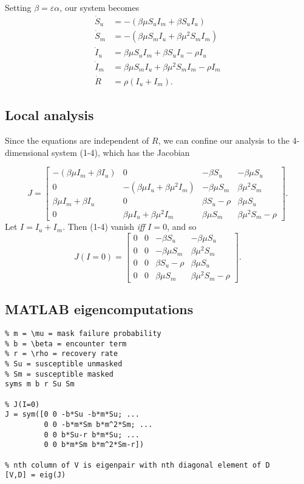 \documentclass[11pt]{article}
\begin{document}
Setting $\beta = \varepsilon \alpha$, our system becomes
\begin{align}
  \dot{S}_{u} &= -(\beta \mu S_{u} I_{m}+\beta S_{u} I_{u}) \\
  \dot{S}_{m} &= -(\beta \mu S_{m} I_{u}+\beta \mu^2 S_{m} I_{m}) \\
  \dot{I}_{u} &= \beta \mu S_{u} I_{m}+\beta S_{u} I_{u}-\rho I_{u} \\
  \dot{I}_{m} &= \beta \mu S_{m} I_{u}+\beta \mu^2 S_{m} I_{m}-\rho I_{m} \\
  \dot{R} &= \rho (I_{u}+I_{m}).
\end{align}

\subsection*{Local analysis}
Since the equations are independent of $R$, we can confine our analysis to the 4-dimensional system (1-4), which has the Jacobian

\[J =
\begin{bmatrix}
  -(\beta \mu I_m + \beta I_u) & 0 & -\beta S_u & -\beta \mu S_u \\
  0 & -(\beta \mu I_u + \beta \mu^2 I_m) & -\beta \mu S_m & \beta \mu^2 S_m \\
  \beta \mu I_m + \beta I_{u} & 0 & \beta S_{u} - \rho & \beta \mu S_{u} \\
  0 & \beta \mu I_{u} + \beta \mu^{2}I_{m} & \beta \mu S_{m} & \beta \mu^{2} S_{m} - \rho
\end{bmatrix}.
\]
Let $I = I_{u} + I_{m}.$ Then (1-4) vanish \textit{iff} $I = 0$, and so
\[ J(I=0)=
\begin{bmatrix}
  0 & 0 & -\beta S_u & -\beta \mu S_u \\
  0 & 0 & -\beta \mu S_m & \beta \mu^2 S_m \\
  0 & 0 & \beta S_u - \rho & \beta \mu S_{u} \\
  0 & 0 & \beta \mu S_{m} & \beta \mu^{2} S_{m} - \rho
\end{bmatrix}.\]

\subsection*{MATLAB eigencomputations}
\begin{verbatim}
% m = \mu = mask failure probability
% b = \beta = encounter term
% r = \rho = recovery rate
% Su = susceptible unmasked
% Sm = susceptible masked
syms m b r Su Sm

% J(I=0)
J = sym([0 0 -b*Su -b*m*Su; ...
         0 0 -b*m*Sm b*m^2*Sm; ...
         0 0 b*Su-r b*m*Su; ...
         0 0 b*m*Sm b*m^2*Sm-r])

% nth column of V is eigenpair with nth diagonal element of D
[V,D] = eig(J)
\end{verbatim}
\end{document}
